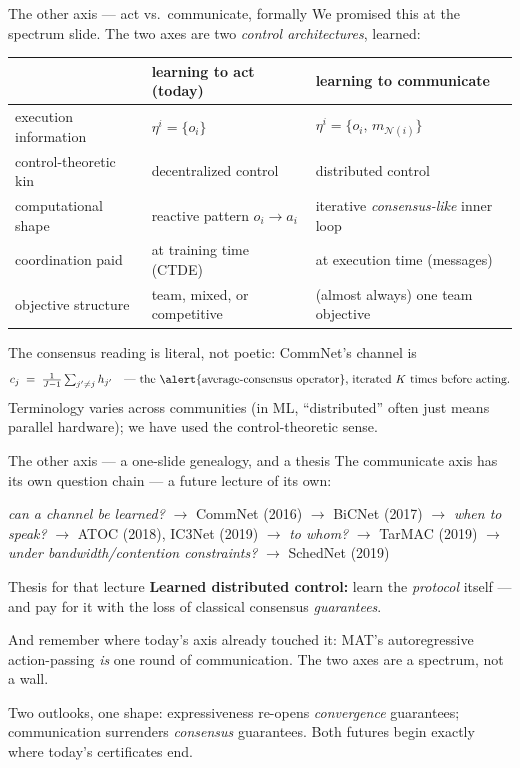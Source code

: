 \documentclass[10pt, aspectratio=169]{beamer}
\begin{document}
\begin{frame}{The other axis --- act vs.\ communicate, formally}
We promised this at the spectrum slide. The two axes are two \emph{control architectures}, learned:
\smallskip
\begin{center}\footnotesize\renewcommand{\arraystretch}{1.5}
\begin{tabular}{l|l|l}
 & \textbf{learning to act} \;(today) & \textbf{learning to communicate} \\
\hline
execution information & $\eta^i = \{o_i\}$ & $\eta^i = \{o_i,\, m_{\mathcal{N}(i)}\}$ \\
control-theoretic kin & \alert{decentralized control} & \alert{distributed control} \\
computational shape & reactive pattern $o_i \to a_i$ & iterative \emph{consensus-like} inner loop \\
coordination paid & at training time (CTDE) & at execution time (messages) \\
objective structure & team, mixed, or competitive & (almost always) one team objective \\
\end{tabular}
\end{center}
\smallskip

\pause
The consensus reading is literal, not poetic: CommNet's channel is
\[
c_j \;=\; \tfrac{1}{J-1}\textstyle\sum_{j'\neq j} h_{j'} \quad\text{--- the \alert{average-consensus operator}, iterated $K$ times before acting.}
\]
\smallskip
{\footnotesize\textcolor{mLightBrown}{Terminology varies across communities (in ML, ``distributed'' often just means parallel hardware); we have used the control-theoretic sense.}}
\end{frame}

\begin{frame}{The other axis --- a one-slide genealogy, and a thesis}
The communicate axis has its own question chain --- a future lecture of its own:
\medskip
\begin{center}\footnotesize
\emph{can a channel be learned?} $\to$ CommNet (2016) $\to$ BiCNet (2017) $\to$
\emph{when to speak?} $\to$ ATOC (2018), IC3Net (2019) $\to$
\emph{to whom?} $\to$ TarMAC (2019) $\to$
\emph{under bandwidth/contention constraints?} $\to$ SchedNet (2019)
\end{center}
\medskip

\pause
\begin{block}{Thesis for that lecture}
\centering
\textbf{Learned distributed control:} learn the \emph{protocol} itself --- and pay for it with the loss of classical consensus \emph{guarantees}.
\end{block}
\medskip
\pause
{\footnotesize And remember where today's axis already touched it: MAT's autoregressive action-passing \emph{is} one round of communication. The two axes are a spectrum, not a wall.}
\smallskip

{\footnotesize \alert{Two outlooks, one shape:} expressiveness re-opens \emph{convergence} guarantees; communication surrenders \emph{consensus} guarantees. Both futures begin exactly where today's certificates end.}
\end{frame}
\end{document}
